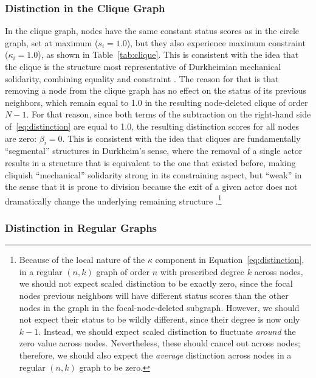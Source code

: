 \documentclass[12pt]{article}
\begin{document}


\subsubsection{Distinction in the Clique Graph}
In the clique graph, nodes have the same constant status scores as in the circle graph, set at maximum ($s_i = 1.0$), but they also experience maximum constraint ($\kappa_i = 1.0$), as shown in Table~\ref{tab:clique}. This is consistent with the idea that the clique is the structure most representative of Durkheimian mechanical solidarity, combining equality and constraint \citep{breiger1998solidarity-afa}. The reason for that is that removing a node from the clique graph has no effect on the status of its previous neighbors, which remain equal to 1.0 in the resulting node-deleted clique of order $N-1$. For that reason, since both terms of the subtraction on the right-hand side of~\ref{eq:distinction} are equal to 1.0, the resulting distinction scores for all nodes are zero: $\beta_i = 0$. This is consistent with the idea that cliques are fundamentally ``segmental'' structures in Durkheim's \citeyearpar{durkheim1933division-cfd} sense, where the removal of a single actor results in a structure that is equivalent to the one that existed before, making cliquish ``mechanical'' solidarity strong in its constraining aspect, but ``weak'' in the sense that it is prone to division because the exit of a given actor does not dramatically change the underlying remaining structure \citep{breiger1998solidarity-afa}.\footnote{Because of the local nature of the $\kappa$ component in Equation~\ref{eq:distinction}, in a regular $(n, k)$ graph of order $n$ with prescribed degree $k$ across nodes, we should not expect scaled distinction to be exactly zero, since the focal nodes previous neighbors will have different status scores than the other nodes in the graph in the focal-node-deleted subgraph. However, we should not expect their status to be wildly different, since their degree is now only $k-1$. Instead, we should expect scaled distinction to fluctuate \textit{around} the zero value across nodes. Nevertheless, these should cancel out across nodes; therefore, we should also expect the \textit{average} distinction across nodes in a regular $(n, k)$ graph to be zero.} 



\subsubsection{Distinction in Regular Graphs}
\end{document}
